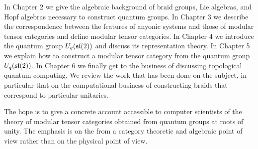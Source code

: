 In Chapter 2 we give the algebraic background of braid groups, Lie algebras,
and Hopf algebras necessary to construct quantum groups. In Chapter 3 we describe the
correspondence between the features of anyonic systems and those of modular
tensor categories and define modular tensor categories.  In
Chapter 4 we introduce the quantum group $U_q(\mathfrak{sl}(2))$ and discuss its
representation theory. In
Chapter 5 we explain how to construct a modular tensor category from the
quantum group $U_q(\mathfrak{sl}(2))$. In Chapter 6 we finally get to the business of
discussing topological quantum computing. We review the work that has been done
on the subject, in particular that on the computational business of
constructing braids that correspond to particular unitaries. 

The hope is to give a concrete account accessible to computer scientists of the
theory of modular tensor categories obtained from quantum groups at roots of
unity. The emphasis is on the from a category theoretic and algebraic point of
view rather than on the physical point of view. 

